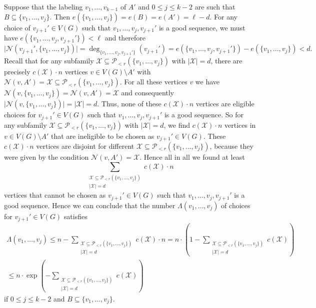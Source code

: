 \documentclass[11pt]{article}
\theoremstyle{definition}
\numberwithin{equation}{section}
\begin{document}
Suppose that the labeling $v_1,\dots,v_{k-1}$ of $A'$ and $0\leq j\leq k-2$ are such that $B\subseteq \lbrace v_1,\dots,v_j\rbrace$. Then $e(\lbrace v_1,\dots,v_j\rbrace)=e(B)=e(A')=\ell-d$. For any choice of $v_{j+1}'\in V(G)$ such that $v_1,\dots,v_j,v_{j+1}'$ is a good sequence, we must have $e(\lbrace v_1,\dots,v_j, v_{j+1}'\rbrace)<\ell$ and therefore
\[\vert \mathcal{N}(v_{j+1}',\lbrace v_1,\dots,v_j\rbrace)\vert=\deg_{\lbrace v_1,\dots,v_j,v_{j+1}'\rbrace}(v_{j+1}')=e(\lbrace v_1,\dots,v_j, v_{j+1}'\rbrace)-e(\lbrace v_1,\dots,v_j\rbrace)<d.\]
Recall that for any subfamily $\mathcal{X}\subseteq \mathcal{P}\!_{<r}(\lbrace v_1,\dots,v_j\rbrace)$ with $\vert \mathcal{X}\vert=d$, there are precisely $c(\mathcal{X})\cdot n$ vertices $v\in V(G)\setminus A'$ with $\mathcal{N}(v,A')=\mathcal{X}\subseteq \mathcal{P}\!_{<r}(\lbrace v_1,\dots,v_j\rbrace)$. For all these vertices $v$ we have $\mathcal{N}(v, \lbrace v_1,\dots,v_j\rbrace)=\mathcal{N}(v,A')=\mathcal{X}$ and consequently $\vert \mathcal{N}(v, \lbrace v_1,\dots,v_j\rbrace)\vert=\vert \mathcal{X}\vert=d$. Thus, none of these $c(\mathcal{X})\cdot n$ vertices are eligible choices for $v_{j+1}'\in V(G)$ such that $v_1,\dots,v_j,v_{j+1}'$ is a good sequence. So for any subfamily $\mathcal{X}\subseteq \mathcal{P}\!_{<r}(\lbrace v_1,\dots,v_j\rbrace)$ with $\vert \mathcal{X}\vert=d$, we find $c(\mathcal{X})\cdot n$ vertices in $v\in V(G)\setminus A'$ that are ineligible to be chosen as $v_{j+1}'\in V(G)$. These $c(\mathcal{X})\cdot n$ vertices are disjoint for different $\mathcal{X}\subseteq \mathcal{P}\!_{<r}(\lbrace v_1,\dots,v_j\rbrace)$, because they were given by the condition $\mathcal{N}(v,A')=\mathcal{X}$. Hence all in all we found at least
\[\sum_{\substack{\mathcal{X}\subseteq \mathcal{P}\!_{<r}(\lbrace v_1,\dots,v_j\rbrace)\\\vert \mathcal{X}\vert=d}}c(\mathcal{X})\cdot n\]
vertices that cannot be chosen as $v_{j+1}'\in V(G)$ such that $v_1,\dots,v_j,v_{j+1}'$ is a good sequence. Hence we can conclude that the number $\Lambda(v_1,\dots,v_{j})$ of choices for $v_{j+1}'\in V(G)$ satisfies
\begin{multline*}
\Lambda(v_1,\dots,v_{j})\leq n-\sum_{\substack{\mathcal{X}\subseteq \mathcal{P}\!_{<r}(\lbrace v_1,\dots,v_j\rbrace)\\\vert \mathcal{X}\vert=d}}c(\mathcal{X})\cdot n=n\cdot \left(1-\sum_{\substack{\mathcal{X}\subseteq \mathcal{P}\!_{<r}(\lbrace v_1,\dots,v_j\rbrace)\\\vert \mathcal{X}\vert=d}}c(\mathcal{X})\right)\\
\leq n\cdot \exp\left(-\sum_{\substack{\mathcal{X}\subseteq \mathcal{P}\!_{<r}(\lbrace v_1,\dots,v_j\rbrace)\\\vert \mathcal{X}\vert=d}}c(\mathcal{X})\right)
\end{multline*}
if $0\leq j\leq k-2$ and $B\subseteq \lbrace v_1,\dots,v_j\rbrace$.
\end{document}
